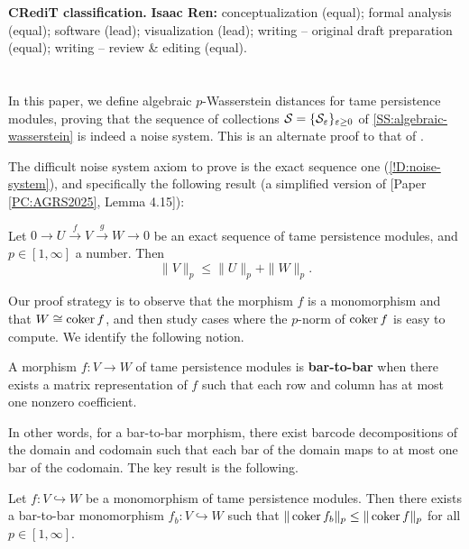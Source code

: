 \textbf{\sffamily CRediT classification.} \textbf{Isaac Ren:} conceptualization (equal); formal analysis (equal); software (lead); visualization (lead); writing -- original draft preparation (equal); writing -- review \& editing (equal).

\section[Algebraic Wasserstein distances]{}

In this paper, we define algebraic $p$-Wasserstein distances for tame persistence modules, proving that the sequence of collections $\mathcal{S} = \{\mathcal{S}_\varepsilon\}_{\varepsilon \geq 0}$ of \cref{SS:algebraic-wasserstein} is indeed a noise system. This is an alternate proof to that of \cite{SkrabaTurner2023}.

The difficult noise system axiom to prove is the exact sequence one (\cref{!D:noise-system}), and specifically the following result (a simplified version of [Paper \ref{PC:AGRS2025}, Lemma 4.15]):

\begin{proposition}
\label{P:triangular-ineq}
  Let $0 \to U \xrightarrow{f} V \xrightarrow{g} W \to 0$ be an exact sequence of tame persistence modules, and $p \in [1, \infty]$ a number. Then
  \[
    \| V \|_p \leq \| U \|_p + \| W \|_p.
  \]
\end{proposition}

Our proof strategy is to observe that the morphism $f$ is a monomorphism and that $W \cong \operatorname{coker} f$, and then study cases where the $p$-norm of $\operatorname{coker} f$ is easy to compute. We identify the following notion.

\begin{definition}
\label{!D:bar-to-bar}
  A morphism $f \colon V \to W$ of tame persistence modules is \textbf{bar-to-bar} when there exists a matrix representation of $f$ such that each row and column has at most one nonzero coefficient.
\end{definition}

In other words, for a bar-to-bar morphism, there exist barcode decompositions of the domain and codomain such that each bar of the domain maps to at most one bar of the codomain. The key result is the following.

\begin{theorem}
\label{T:induced-btb}
  Let $f \colon V \hookrightarrow W$ be a monomorphism of tame persistence modules. Then there exists a bar-to-bar monomorphism $f_b \colon V \hookrightarrow W$ such that $\| \operatorname{coker} f_b \|_p \leq \| \operatorname{coker} f \|_p$ for all $p \in [1, \infty]$.
\end{theorem}

